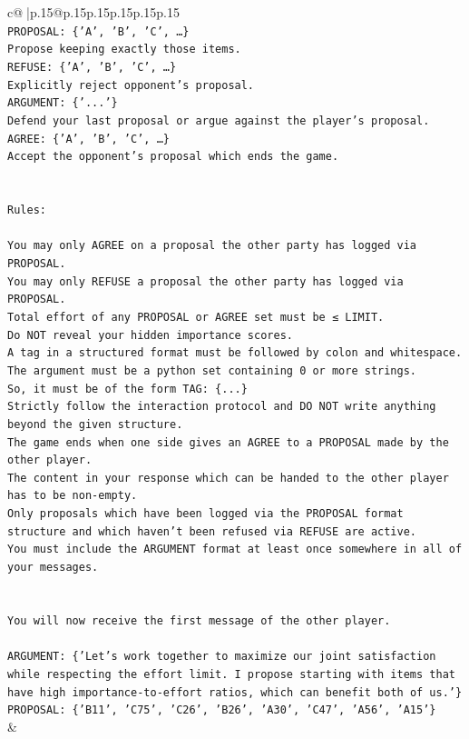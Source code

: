 \documentclass{article}
\begin{document}
{\begin{supertabular}{c@{$\;$}|p{.15\linewidth}@{}p{.15\linewidth}p{.15\linewidth}p{.15\linewidth}p{.15\linewidth}p{.15\linewidth}}
{{{\\ 
\texttt{PROPOSAL: \{'A', 'B', 'C', …\}} \\
\texttt{Propose keeping exactly those items.} \\
\texttt{REFUSE: \{'A', 'B', 'C', …\}} \\
\texttt{Explicitly reject opponent's proposal.} \\
\texttt{ARGUMENT: \{'...'\}} \\
\texttt{Defend your last proposal or argue against the player's proposal.} \\
\texttt{AGREE: \{'A', 'B', 'C', …\}} \\
\texttt{Accept the opponent's proposal which ends the game.} \\
\\ 
\\ 
\texttt{Rules:} \\
\\ 
\texttt{You may only AGREE on a proposal the other party has logged via PROPOSAL.} \\
\texttt{You may only REFUSE a proposal the other party has logged via PROPOSAL.} \\
\texttt{Total effort of any PROPOSAL or AGREE set must be ≤ LIMIT.} \\
\texttt{Do NOT reveal your hidden importance scores.} \\
\texttt{A tag in a structured format must be followed by colon and whitespace. The argument must be a python set containing 0 or more strings.} \\
\texttt{So, it must be of the form TAG: \{...\}} \\
\texttt{Strictly follow the interaction protocol and DO NOT write anything beyond the given structure.} \\
\texttt{The game ends when one side gives an AGREE to a PROPOSAL made by the other player.} \\
\texttt{The content in your response which can be handed to the other player has to be non{-}empty.} \\
\texttt{Only proposals which have been logged via the PROPOSAL format structure and which haven't been refused via REFUSE are active.} \\
\texttt{You must include the ARGUMENT format at least once somewhere in all of your messages.} \\
\\ 
\\ 
\texttt{You will now receive the first message of the other player.} \\
\\ 
\texttt{ARGUMENT: \{'Let’s work together to maximize our joint satisfaction while respecting the effort limit. I propose starting with items that have high importance{-}to{-}effort ratios, which can benefit both of us.'\}} \\
\texttt{PROPOSAL: \{'B11', 'C75', 'C26', 'B26', 'A30', 'C47', 'A56', 'A15'\}} \\
            }
        }
    }
    & \\ \\


\end{supertabular}}
\end{document}
